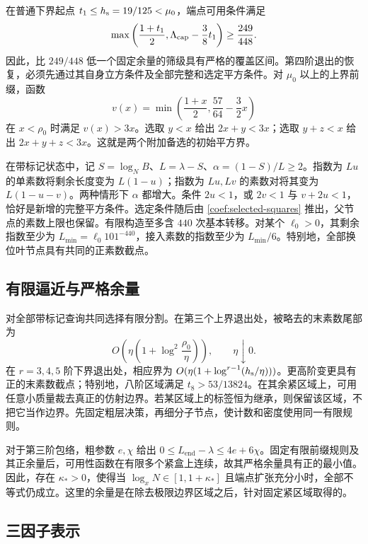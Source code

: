 在普通下界起点 $t_1\le {h_{\rm s}}=19/125<\mu_0$，端点可用条件满足
\[
 \max\left(\frac{1+t_1}{2},\Lambda_{\rm cap}-\frac38t_1\right)
 \ge\frac{249}{448}.
\]
因此，比 $249/448$ 低一个固定余量的筛级具有严格的覆盖区间。第四阶退出的恢复，必须先通过其自身立方条件及全部完整和选定平方条件。对 $\mu_0$ 以上的上界前缀，函数
\[
 v(x)=\min\left(\frac{1+x}{2},\frac{57}{64}-\frac32x\right)
\]
在 $x<\rho_0$ 时满足 $v(x)>3x$。选取 $y<x$ 给出 $2x+y<3x$；选取 $y+z<x$ 给出 $2x+y+z<3x$。这就是两个附加备选的初始平方界。

在带标记状态中，记 $S=\log_N B$、$L=\lambda-S$、$\alpha=(1-S)/L\ge2$。指数为 $Lu$ 的单素数将剩余长度变为 $L(1-u)$；指数为 $Lu,Lv$ 的素数对将其变为 $L(1-u-v)$。两种情形下 $\alpha$ 都增大。条件 $2u<1$，或 $2v<1$ 与 $v+2u<1$，恰好是新增的完整平方条件。选定条件随后由 \eqref{coef:selected-squares} 推出，父节点的素数上限也保留。有限构造至多含 $440$ 次基本转移。对某个 $\ell_0>0$，其剩余指数至少为 $L_{\min}=\ell_0 101^{-440}$，接入素数的指数至少为 $L_{\min}/6$。特别地，全部换位叶节点具有共同的正素数截点。

\subsection{有限逼近与严格余量}

对全部带标记查询共同选择有限分割。在第三个上界退出处，被略去的末素数尾部为
\[
 O\!\left(\eta\left(1+\log^2\frac{\rho_0}{\eta}\right)\right),
 \qquad\eta\downarrow0.
\]
在 $r=3,4,5$ 阶下界退出处，相应界为 $O(\eta(1+\log^{r-1}({h_{\rm s}}/\eta)))$。更高阶变更具有正的末素数截点；特别地，八阶区域满足 $t_8>53/13824$。在其余紧区域上，可用任意小质量裁去真正的仿射边界。若某区域上的标签恒为继承，则保留该区域，不把它当作边界。先固定粗层决策，再细分子节点，使计数和密度使用同一有限规则。

对于第三阶包络，粗参数 $e,\chi$ 给出 $0\le L_{\mathrm{end}}-\lambda\le4e+6\chi$。固定有限前缀规则及其正余量后，可用性函数在有限多个紧盒上连续，故其严格余量具有正的最小值。因此，存在 $\kappa_*>0$，使得当 $\log_xN\in[1,1+\kappa_*]$ 且端点扩张充分小时，全部不等式仍成立。这里的余量是在除去极限边界区域之后，针对固定紧区域取得的。

\subsection{三因子表示}

